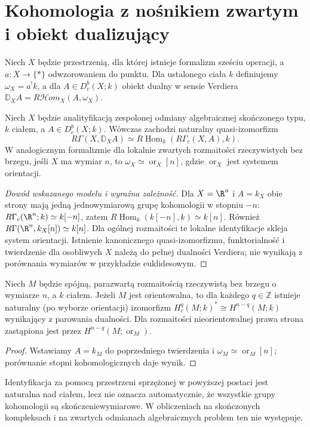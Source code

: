 \section{Kohomologia z nośnikiem zwartym i obiekt dualizujący}
\begin{definicja}
Niech $X$ będzie przestrzenią, dla której istnieje
formalizm sześciu operacji, a $a:X\to\{*\}$
odwzorowaniem do punktu. Dla ustalonego ciała $k$
definiujemy $\omega_X=a^!k$, a dla $A\in D^b_c(X;k)$
obiekt dualny w sensie Verdiera
$\mathbb D_XA=R\mathcal Hom_X(A,\omega_X)$.
\end{definicja}
\begin{twierdzenie}
\label{thm:xvi-verdier}
Niech $X$ będzie analityfikacją zespolonej
odmiany algebraicznej skończonego typu,
$k$ ciałem, a $A\in D^b_c(X;k)$.
Wówczas zachodzi naturalny quasi-izomorfizm
\[
R\Gamma(X,\mathbb D_X A)
\simeq R\operatorname{Hom}_k(R\Gamma_c(X,A),k).
\]
W analogicznym formalizmie dla lokalnie zwartych
rozmaitości rzeczywistych bez brzegu, jeśli $X$ ma
wymiar $n$, to $\omega_X\simeq\operatorname{or}_X[n]$,
gdzie $\operatorname{or}_X$ jest systemem orientacji.
\end{twierdzenie}
\begin{proof}[Dowód wskazanego modelu i wyraźna zależność]
Dla $X=\R^n$ i $A=k_X$ obie strony mają jedną
jednowymiarową grupę kohomologii w stopniu $-n$:
$R\Gamma_c(\R^n;k)\simeq k[-n]$, zatem
$R\operatorname{Hom}_k(k[-n],k)\simeq k[n]$.
Również $R\Gamma(\R^n,k_X[n])\simeq k[n]$.
Dla ogólnej rozmaitości te lokalne identyfikacje skleja
system orientacji. Istnienie kanonicznego quasi-izomorfizmu,
funktorialność i twierdzenie dla osobliwych $X$ należą do
pełnej dualności Verdiera; nie wynikają z porównania wymiarów
w przykładzie euklidesowym.
\end{proof}
\begin{wniosek}
Niech $M$ będzie spójną, parazwartą rozmaitością
rzeczywistą bez brzegu o wymiarze $n$, a $k$ ciałem.
Jeżeli $M$ jest orientowalna, to dla każdego
$q\in\mathbb Z$ istnieje naturalny (po wyborze orientacji)
izomorfizm $H_c^q(M;k)^*\cong H^{n-q}(M;k)$
wynikający z parowania dualności.
Dla rozmaitości nieorientowalnej prawa strona
zastąpiona jest przez
$H^{n-q}(M;\operatorname{or}_M)$.
\end{wniosek}
\begin{proof}
Wstawiamy $A=k_M$ do poprzedniego twierdzenia i
$\omega_M\simeq\operatorname{or}_M[n]$;
porównanie stopni kohomologicznych daje wynik.
\end{proof}
\begin{uwaga}
Identyfikacja za pomocą przestrzeni sprzężonej w powyższej postaci jest
naturalna nad ciałem, lecz nie oznacza automatycznie, że
wszystkie grupy kohomologii są skończeniewymiarowe.
W obliczeniach na skończonych kompleksach i na zwartych
odmianach algebraicznych problem ten nie występuje.
\end{uwaga}

